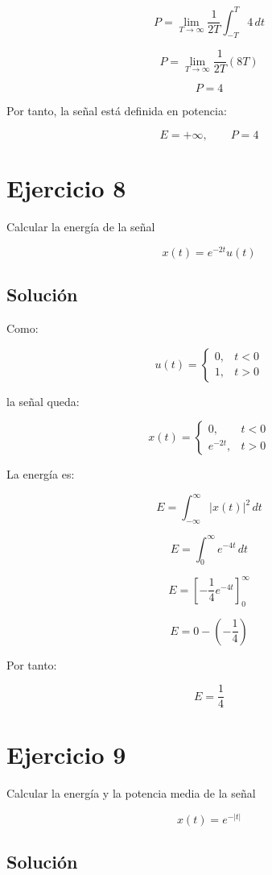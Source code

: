\documentclass[fleqn]{article}
\begin{document}
	\[
	P
	=
	\lim_{T\to\infty}
	\frac{1}{2T}
	\int_{-T}^{T}
	4\,dt
	\]

	\[
	P
	=
	\lim_{T\to\infty}
	\frac{1}{2T}
	(8T)
	\]

	\[
	\boxed{
	P=4
	}
	\]

	Por tanto, la señal está definida en potencia:

	\[
	\boxed{
	E=+\infty,
	\qquad
	P=4
	}
	\]

\section{Ejercicio 8}
	Calcular la energía de la señal

	\[
	x(t)=e^{-2t}u(t)
	\]

	\subsection{Solución}

	Como:

	\[
	u(t)=
	\begin{cases}
	0, & t<0 \\[1mm]
	1, & t>0
	\end{cases}
	\]

	la señal queda:

	\[
	x(t)=
	\begin{cases}
	0, & t<0 \\[1mm]
	e^{-2t}, & t>0
	\end{cases}
	\]

	La energía es:

	\[
	E
	=
	\int_{-\infty}^{\infty}
	|x(t)|^2\,dt
	\]

	\[
	E
	=
	\int_0^{\infty}
	e^{-4t}\,dt
	\]

	\[
	E
	=
	\left[
	-\frac{1}{4}e^{-4t}
	\right]_0^{\infty}
	\]

	\[
	E
	=
	0-\left(-\frac{1}{4}\right)
	\]

	Por tanto:

	\[
	\boxed{
	E=\frac{1}{4}
	}
	\]

\section{Ejercicio 9}
	Calcular la energía y la potencia media de la señal

	\[
	x(t)=e^{-|t|}
	\]

	\subsection{Solución}
\end{document}
